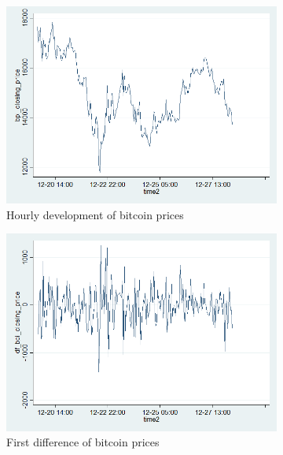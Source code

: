 \documentclass[a4paper,american,12pt]{article}
\begin{document}
\begin{spacing}{1.2}
\begin{figure}[H]
	\begin{subfigure}{.3\textwidth}
	\centering
	\includegraphics[width=1.12\textwidth]{stata_export_graphs/graph_plot_bpi.png}
	\caption{Hourly development of bitcoin prices}
	\end{subfigure}\hfill
	\begin{subfigure}{.3\textwidth}
	\centering
	\includegraphics[width=1.12\textwidth]{stata_export_graphs/graph_plot_df_bpi.png}
	\caption{First difference of bitcoin prices}
	\end{subfigure}\hfill
	\begin{subfigure}{.3\textwidth}
	\centering

\end{subfigure}
\end{figure}
\end{spacing}
\end{document}
